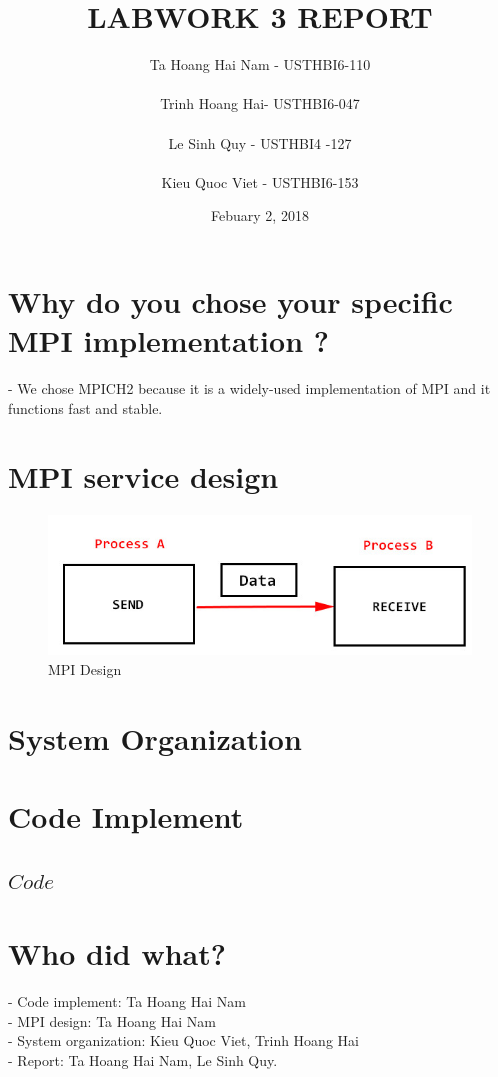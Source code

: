 \documentclass[10.5pt,a4paper]{article}
\title{LABWORK 3 REPORT}
\author{Ta Hoang Hai Nam - USTHBI6-110 \\ \\ Trinh Hoang Hai- USTHBI6-047 \\ \\ Le Sinh Quy - USTHBI4 -127 \\ \\ Kieu Quoc Viet - USTHBI6-153}
\date{Febuary 2, 2018}
\begin{document}
\maketitle
\newpage 
\section{ Why do you chose your specific MPI implementation ?}
- We chose MPICH2 because it is a widely-used implementation of MPI and it functions fast and stable.
\section{MPI service design}
\begin{figure}[h!]
\includegraphics[width=\linewidth]{MPI_design.jpg}
\caption{MPI Design}
\end{figure}
\section{System Organization}

\section{Code Implement}
\subsection*{$Code$}

\section{Who did what?}
-  Code implement: Ta Hoang Hai Nam \\
-  MPI design: Ta Hoang Hai Nam \\ 
-  System organization:  Kieu Quoc Viet, Trinh Hoang Hai\\
-  Report: Ta Hoang Hai Nam, Le Sinh Quy.
\end{document}
